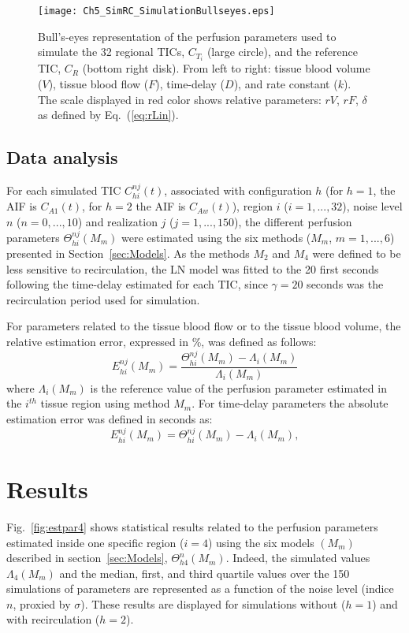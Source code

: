 \begin{figure}
\center
\texttt{[image: Ch5\_SimRC\_SimulationBullseyes.eps]}
\caption{Bull's-eyes representation of the perfusion parameters used to simulate the 32 regional TICs, $C_{T_i}$ (large circle), and the reference TIC, $C_R$ (bottom right disk). From left to right: tissue blood volume ($V$), tissue blood flow ($F$), time-delay ($D$), and rate constant ($k$). The scale displayed in red color shows relative parameters: $rV$, $rF$, $\delta$ as defined by Eq.~(\ref{eq:rLin}).}
\label{fig:simpar}
\vspace{-3mm}
\end{figure}

\subsection{Data analysis}
\label{sec:datana}

For each simulated TIC $C_{hi}^{nj}(t)$, associated with configuration $h$ (for $h=1$, the AIF is $C_{A1}(t)$, for $h=2$ the AIF is $C_{Aw}(t)$), region $i$ ($i=1,..., 32$), noise level $n$ ($n=0, ...,10$) and realization $j$ ($j=1,...,150$), the different perfusion parameters $\Theta_{hi}^{nj}(M_m)$ were estimated using the six methods ($M_m$, $m=1, ..., 6$) presented in Section~\ref{sec:Models}.
As the methods $M_2$ and $M_4$ were defined to be less sensitive to recirculation, the LN model was fitted to the 20 first seconds following the time-delay estimated for each TIC, since $\gamma = 20$ seconds was the recirculation period used for simulation.

For parameters related to the tissue blood flow or to the tissue blood volume, the relative estimation error, expressed in \%, was defined as follows: 
\begin{equation}
E_{hi}^{nj}(M_m) = \frac{\Theta_{hi}^{nj}(M_m) - \Lambda_{i}(M_m)}{\Lambda_{i}(M_m)}
\end{equation}
where $\Lambda_{i}(M_m)$ is the reference value of the perfusion parameter estimated in the $i^{th}$ tissue region using method $M_m$.
For time-delay parameters the absolute estimation error was defined in seconds as: 
\begin{equation}
E_{hi}^{nj}(M_m) =\Theta_{hi}^{nj}(M_m) - \Lambda_{i}(M_m),
\end{equation}

\section{Results}
Fig.~\ref{fig:estpar4} shows statistical results related to the perfusion parameters estimated inside one specific region ($i=4$) using the six models $(M_m)$ described in section~\ref{sec:Models}, $\Theta_{h4}^{n}(M_m)$.
Indeed, the simulated values $\Lambda_{4}(M_m)$ and the median, first, and third quartile values over the 150 simulations of parameters are represented as a function of the noise level (indice $n$, proxied by $\sigma$). These results are displayed for simulations without ($h=1$) and with recirculation ($h=2$).

